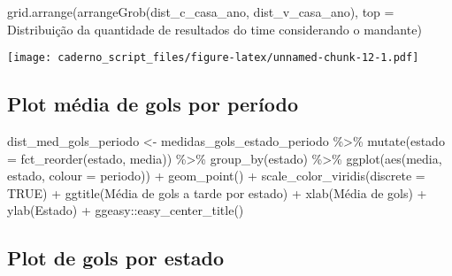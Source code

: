 \documentclass[
]{article}
\newenvironment{Shaded}{\begin{snugshade}}{\end{snugshade}}
\newcommand{\AttributeTok}[1]{\textcolor[rgb]{0.77,0.63,0.00}{#1}}
\newcommand{\ConstantTok}[1]{\textcolor[rgb]{0.00,0.00,0.00}{#1}}
\newcommand{\FunctionTok}[1]{\textcolor[rgb]{0.00,0.00,0.00}{#1}}
\newcommand{\NormalTok}[1]{#1}
\newcommand{\OtherTok}[1]{\textcolor[rgb]{0.56,0.35,0.01}{#1}}
\newcommand{\SpecialCharTok}[1]{\textcolor[rgb]{0.00,0.00,0.00}{#1}}
\newcommand{\StringTok}[1]{\textcolor[rgb]{0.31,0.60,0.02}{#1}}
\begin{document}
\begin{Shaded}
\begin{Highlighting}[]
\FunctionTok{grid.arrange}\NormalTok{(}\FunctionTok{arrangeGrob}\NormalTok{(dist\_c\_casa\_ano, dist\_v\_casa\_ano), }
                         \AttributeTok{top =} \StringTok{\textquotesingle{}Distribuição da quantidade de resultados do time considerando o mandante\textquotesingle{}}\NormalTok{)}
\end{Highlighting}
\end{Shaded}

\texttt{[image: caderno\_script\_files/figure-latex/unnamed-chunk-12-1.pdf]}

\hypertarget{plot-muxe9dia-de-gols-por-peruxedodo}{%
\subsection{Plot média de gols por
período}\label{plot-muxe9dia-de-gols-por-peruxedodo}}

\begin{Shaded}
\begin{Highlighting}[]
\NormalTok{dist\_med\_gols\_periodo }\OtherTok{\textless{}{-}}\NormalTok{ medidas\_gols\_estado\_periodo }\SpecialCharTok{\%\textgreater{}\%} 
  \FunctionTok{mutate}\NormalTok{(}\AttributeTok{estado =} \FunctionTok{fct\_reorder}\NormalTok{(estado, media)) }\SpecialCharTok{\%\textgreater{}\%}
  \FunctionTok{group\_by}\NormalTok{(estado) }\SpecialCharTok{\%\textgreater{}\%}
  \FunctionTok{ggplot}\NormalTok{(}\FunctionTok{aes}\NormalTok{(media, estado, }\AttributeTok{colour =}\NormalTok{ periodo)) }\SpecialCharTok{+} \FunctionTok{geom\_point}\NormalTok{() }\SpecialCharTok{+}
  \FunctionTok{scale\_color\_viridis}\NormalTok{(}\AttributeTok{discrete =} \ConstantTok{TRUE}\NormalTok{) }\SpecialCharTok{+}
  \FunctionTok{ggtitle}\NormalTok{(}\StringTok{\textquotesingle{}Média de gols a tarde por estado\textquotesingle{}}\NormalTok{) }\SpecialCharTok{+} 
  \FunctionTok{xlab}\NormalTok{(}\StringTok{\textquotesingle{}Média de gols\textquotesingle{}}\NormalTok{) }\SpecialCharTok{+} \FunctionTok{ylab}\NormalTok{(}\StringTok{\textquotesingle{}Estado\textquotesingle{}}\NormalTok{) }\SpecialCharTok{+}
\NormalTok{   ggeasy}\SpecialCharTok{::}\FunctionTok{easy\_center\_title}\NormalTok{()}
\end{Highlighting}
\end{Shaded}

\hypertarget{plot-de-gols-por-estado}{%
\subsection{Plot de gols por estado}\label{plot-de-gols-por-estado}}
\end{document}
